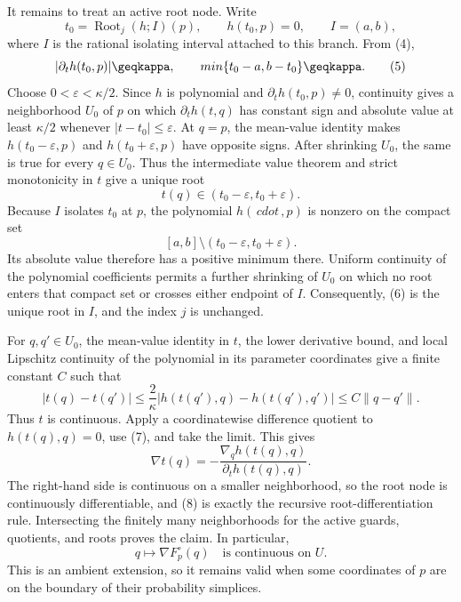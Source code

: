 It remains to treat an active root node. Write
\[
 t_0=\operatorname{Root}_j(h;I)(p),
 \qquad h(t_0,p)=0,
 \qquad I=(a,b),
\]
where \(I\) is the rational isolating interval attached to this branch. From (4),
\[
 |\partial_t h(t_0,p)|\geqkappa,
 \qquad
 min\{t_0-a,b-t_0\}\geqkappa. \tag{5}
\]
Choose \(0<\varepsilon<\kappa/2\). Since \(h\) is polynomial and \(\partial_t h(t_0,p)\neq0\), continuity gives a neighborhood \(U_0\) of \(p\) on which \(\partial_t h(t,q)\) has constant sign and absolute value at least \(\kappa/2\) whenever \(|t-t_0|\leq\varepsilon\). At \(q=p\), the mean-value identity makes \(h(t_0-\varepsilon,p)\) and \(h(t_0+\varepsilon,p)\) have opposite signs. After shrinking \(U_0\), the same is true for every \(q\in U_0\). Thus the intermediate value theorem and strict monotonicity in \(t\) give a unique root
\[
 t(q)\in(t_0-\varepsilon,t_0+\varepsilon). \tag{6}
\]
Because \(I\) isolates \(t_0\) at \(p\), the polynomial \(h(\,cdot\,,p)\) is nonzero on the compact set
\[
 [a,b]\setminus(t_0-\varepsilon,t_0+\varepsilon).
\]
Its absolute value therefore has a positive minimum there. Uniform continuity of the polynomial coefficients permits a further shrinking of \(U_0\) on which no root enters that compact set or crosses either endpoint of \(I\). Consequently, (6) is the unique root in \(I\), and the index \(j\) is unchanged.

For \(q,q'\in U_0\), the mean-value identity in \(t\), the lower derivative bound, and local Lipschitz continuity of the polynomial in its parameter coordinates give a finite constant \(C\) such that
\[
 |t(q)-t(q')|
 \leq \frac{2}{\kappa}
       |h(t(q'),q)-h(t(q'),q')|
 \leq C\|q-q'\|. \tag{7}
\]
Thus \(t\) is continuous. Apply a coordinatewise difference quotient to \(h(t(q),q)=0\), use (7), and take the limit. This gives
\[
 \nabla t(q)
 =-\frac{\nabla_q h(t(q),q)}{\partial_t h(t(q),q)}. \tag{8}
\]
The right-hand side is continuous on a smaller neighborhood, so the root node is continuously differentiable, and (8) is exactly the recursive root-differentiation rule. Intersecting the finitely many neighborhoods for the active guards, quotients, and roots proves the claim. In particular,
\[
 q\longmapsto\nabla F_p^{\circ}(q)
 \quad\text{is continuous on }U. \tag{9}
\]
This is an ambient extension, so it remains valid when some coordinates of \(p\) are on the boundary of their probability simplices.


